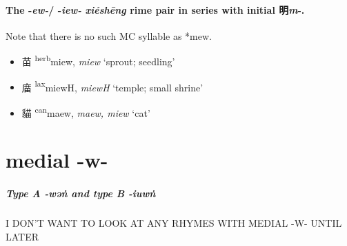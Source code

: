 \paragraph{The -\textit{ew-}/ -\textit{iew-} \textit{xiéshēng} rime pair in series with initial 明\textit{m}-.}

Note that there is no such MC syllable as *mew. 


\begin{itemize}
  \item {\Large{苗}} %
    {\large{{\textsuperscript{herb}}miew}},
    \textit{miew} `sprout; seedling' %

  \item {\Large{庿}} %
    {\large{{\textsuperscript{lax}}miewH}},
    \textit{miewH} `temple; small shrine' %

  \item {\Large{貓}} %
    {\large{{\textsuperscript{can}}maew}},
    \textit{maew, miew} `cat' %

\end{itemize}

\section{medial -w-}

\subparagraph{Type A -\textit{wəṅ} and type B -\textit{iuwṅ}} 

I DON'T WANT TO LOOK AT ANY RHYMES WITH MEDIAL -W- UNTIL LATER


